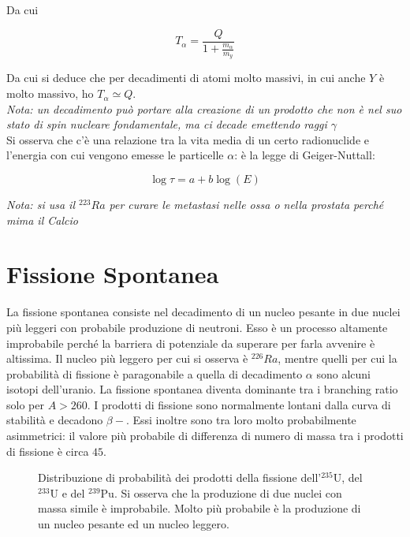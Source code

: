 \documentclass [a4paper, twoside] {book}
\begin{document}
Da cui

\begin{equation}
T_{\alpha}=\frac{Q}{1+\frac{m_{\alpha}}{m_y}} 
\end{equation}

Da cui si deduce che per decadimenti di atomi molto massivi, in cui anche $Y$ è molto massivo, ho $T_{\alpha}\simeq Q$.\\

\emph{Nota: un decadimento può portare alla creazione di un prodotto che non è nel suo stato di spin nucleare fondamentale, ma ci decade emettendo raggi $\gamma$ }\\

Si osserva che c'è una relazione tra la vita media di un certo radionuclide e l'energia con cui vengono emesse le particelle $\alpha$: è la legge di Geiger-Nuttall:

\begin{equation}
\log \tau = a + b \log (E)
\end{equation}

\emph{Nota: si usa il $^{223}Ra$ per curare le metastasi nelle ossa o nella prostata perché mima il Calcio}

\section{Fissione Spontanea}

La fissione spontanea consiste nel decadimento di un nucleo pesante in due nuclei più leggeri con probabile produzione di neutroni. Esso è un processo altamente improbabile perché la barriera di potenziale da superare per farla avvenire è altissima. Il nucleo più leggero per cui si osserva è $^{226}Ra$, mentre quelli per cui la probabilità di fissione è paragonabile a quella di decadimento $\alpha$ sono alcuni isotopi dell'uranio. La fissione spontanea diventa dominante tra i branching ratio solo per $A>260$.
I prodotti di fissione sono normalmente lontani dalla curva di stabilità e decadono $\beta-$. 
Essi inoltre sono tra loro molto probabilmente asimmetrici: il valore più probabile di differenza di numero di massa tra i prodotti di fissione è circa $45$.

\begin{figure} []
\centering
		\caption{Distribuzione di probabilità dei prodotti della fissione dell'$^{235}\text{U}$, del $^{233}\text{U}$ e del $^{239}\text{Pu}$. Si osserva che la produzione di due nuclei con massa simile è improbabile. Molto più probabile è la produzione di un nucleo pesante ed un nucleo leggero.}
         \label{fissionyealds}
\end{figure}
\end{document}
